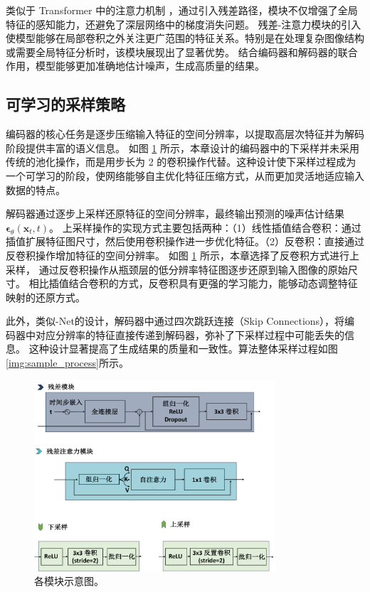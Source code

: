 类似于 Transformer 中的注意力机制 \cite{2017attention}，通过引入残差路径，模块不仅增强了全局特征的感知能力，还避免了深层网络中的梯度消失问题。
残差-注意力模块的引入使模型能够在局部卷积之外关注更广范围的特征关系。特别是在处理复杂图像结构或需要全局特征分析时，该模块展现出了显著优势。
结合编码器和解码器的联合作用，模型能够更加准确地估计噪声，生成高质量的结果。

\subsection{可学习的采样策略}
编码器的核心任务是逐步压缩输入特征的空间分辨率，以提取高层次特征并为解码阶段提供丰富的语义信息。
如图 \ref{img:module} 所示，本章设计的编码器中的下采样并未采用传统的池化操作，而是用步长为 2 的卷积操作代替。这种设计使下采样过程成为一个可学习的阶段，使网络能够自主优化特征压缩方式，从而更加灵活地适应输入数据的特点。

解码器通过逐步上采样还原特征的空间分辨率，最终输出预测的噪声估计结果 $\boldsymbol{\epsilon}_\theta(\mathbf{x}_t, t)$。
上采样操作的实现方式主要包括两种：（1）线性插值结合卷积：通过插值扩展特征图尺寸，然后使用卷积操作进一步优化特征。（2）反卷积：直接通过反卷积操作增加特征的空间分辨率。
如图 \ref{img:module} 所示，本章选择了反卷积方式进行上采样，
通过反卷积操作从瓶颈层的低分辨率特征图逐步还原到输入图像的原始尺寸。
相比插值结合卷积的方式，反卷积具有更强的学习能力，能够动态调整特征映射的还原方式。

此外，类似-Net的设计，解码器中通过四次跳跃连接（Skip Connections），将编码器中对应分辨率的特征直接传递到解码器，弥补了下采样过程中可能丢失的信息。
这种设计显著提高了生成结果的质量和一致性。算法整体采样过程如图\ref{img:sample_process}所示。
\begin{figure}[ht]
    \centering
    \includegraphics[width=0.8\textwidth]{figures/ch3/module.pdf}
    \caption{各模块示意图。}
    \label{img:module}
    \vspace{0.4cm}
\end{figure}

